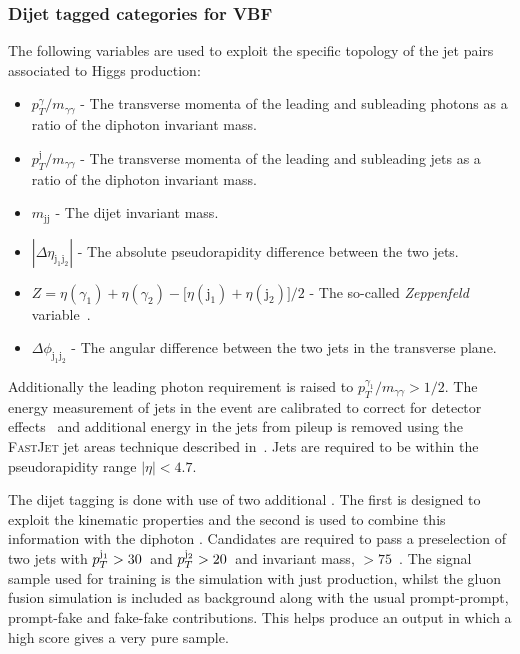 \subsubsection{Dijet tagged categories for VBF}
\label{sec:vbf_tag}

The following variables are used to exploit the specific topology of the jet pairs associated to \VBF Higgs production:

\begin{itemize}
  \item $p_{T}^{\gamma}/m_{\gamma\gamma}$ - The transverse momenta of the leading and subleading photons as a ratio of the diphoton invariant mass.
  \item $p_{T}^{\mathrm{j}}/m_{\gamma\gamma}$ - The transverse momenta of the leading and subleading jets as a ratio of the diphoton invariant mass.
  \item $m_{\mathrm{jj}}$ - The dijet invariant mass.
  \item $|\Delta\eta_{\mathrm{j}_{1}\mathrm{j}_{2}}|$ - The absolute pseudorapidity difference between the two jets.
  \item $Z = \eta(\gamma_{1})+\eta(\gamma_{2}) - \bigl[\eta(\mathrm{j}_{1})+\eta(\mathrm{j}_{2})\bigr]/2$ - The so-called \emph{Zeppenfeld} variable~\cite{Zeppenfeld}.
  \item $\Delta\phi_{\mathrm{j}_{1}\mathrm{j}_{2}}$ - The angular difference between the two jets in the transverse plane.
\end{itemize}

Additionally the leading photon \pT requirement is raised to $p_{T}^{\gamma_{1}}/m_{\gamma\gamma}>1/2$. The energy measurement of jets in the event are calibrated to correct for detector effects~\cite{jet_energy_corrections} and additional energy in the jets from pileup is removed using the \textsc{FastJet} jet areas technique described in~\cite{pu_jets1,pu_jets2,pu_jets3}. Jets are required to be within the pseudorapidity range $|\eta|<4.7$.

The dijet tagging is done with use of two additional \MVAs. The first is designed to exploit the \VBF kinematic properties and the second is used to combine this information with the diphoton \BDT. Candidates are required to pass a \VBF preselection of two jets with $p_{T}^{\mathrm{j}_{1}}>30$~\GeV and $p_{T}^{\mathrm{j}_{2}}>20$~\GeV and invariant mass, \mjj$>75$~\GeV. The signal sample used for training is the \SM \MC simulation with just \VBF production, whilst the \SM gluon fusion \MC simulation is included as background along with the usual prompt-prompt, prompt-fake and fake-fake contributions. This helps produce an output in which a high score gives a very pure \VBF sample.


